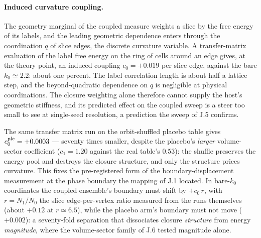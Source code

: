 \documentclass[11pt]{article}
\begin{document}
\paragraph{Induced curvature coupling.} The geometry marginal of the coupled measure weights a slice by the free energy of its labels, and the leading geometric dependence enters through the coordination $q$ of slice edges, the discrete curvature variable. A transfer-matrix evaluation of the label free energy on the ring of cells around an edge gives, at the theory point, an induced coupling $c_0=+0.019$ per slice edge, against the bare $k_0\simeq2.2$: about one percent. The label correlation length is about half a lattice step, and the beyond-quadratic dependence on $q$ is negligible at physical coordinations. The closure weighting alone therefore cannot supply the host's geometric stiffness, and its predicted effect on the coupled sweep is a steer too small to see at single-seed resolution, a prediction the sweep of J.5 confirms.

The same transfer matrix run on the orbit-shuffled placebo table gives $c_0^{\rm plc}=+0.0003$ --- seventy times smaller, despite the placebo's \emph{larger} volume-sector coefficient ($c_1=1.20$ against the real table's $0.53$): the shuffle preserves the energy pool and destroys the closure structure, and only the structure prices curvature. This fixes the pre-registered form of the boundary-displacement measurement at the phase boundary the mapping of J.1 located. In bare-$k_0$ coordinates the coupled ensemble's boundary must shift by $+c_0\,r$, with $r=N_1/N_0$ the slice edge-per-vertex ratio measured from the runs themselves (about $+0.12$ at $r\simeq6.5$), while the placebo arm's boundary must not move ($+0.002$): a seventy-fold separation that dissociates closure \emph{structure} from energy \emph{magnitude}, where the volume-sector family of J.6 tested magnitude alone.
\end{document}

